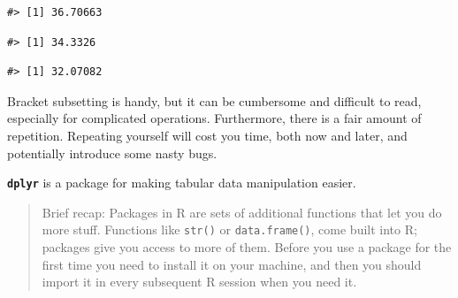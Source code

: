 \documentclass[]{book}
\newenvironment{Shaded}{\begin{snugshade}}{\end{snugshade}}
\newcommand{\KeywordTok}[1]{\textcolor[rgb]{0.13,0.29,0.53}{\textbf{#1}}}
\newcommand{\DataTypeTok}[1]{\textcolor[rgb]{0.13,0.29,0.53}{#1}}
\newcommand{\StringTok}[1]{\textcolor[rgb]{0.31,0.60,0.02}{#1}}
\newcommand{\OtherTok}[1]{\textcolor[rgb]{0.56,0.35,0.01}{#1}}
\newcommand{\OperatorTok}[1]{\textcolor[rgb]{0.81,0.36,0.00}{\textbf{#1}}}
\newcommand{\NormalTok}[1]{#1}
\theoremstyle{definition}
\theoremstyle{definition}
\theoremstyle{definition}
\theoremstyle{remark}
\begin{document}
\begin{Shaded}
\end{Shaded}

\begin{verbatim}
#> [1] 36.70663
\end{verbatim}

\begin{Shaded}
\end{Shaded}

\begin{verbatim}
#> [1] 34.3326
\end{verbatim}

\begin{Shaded}
\end{Shaded}

\begin{verbatim}
#> [1] 32.07082
\end{verbatim}

Bracket subsetting is handy, but it can be cumbersome and difficult to
read, especially for complicated operations. Furthermore, there is a
fair amount of repetition. Repeating yourself will cost you time, both
now and later, and potentially introduce some nasty bugs.

\textbf{\texttt{dplyr}} is a package for making tabular data
manipulation easier.

\begin{quote}
Brief recap: Packages in R are sets of additional functions that let you
do more stuff. Functions like \texttt{str()} or \texttt{data.frame()},
come built into R; packages give you access to more of them. Before you
use a package for the first time you need to install it on your machine,
and then you should import it in every subsequent R session when you
need it.
\end{quote}
\end{document}

